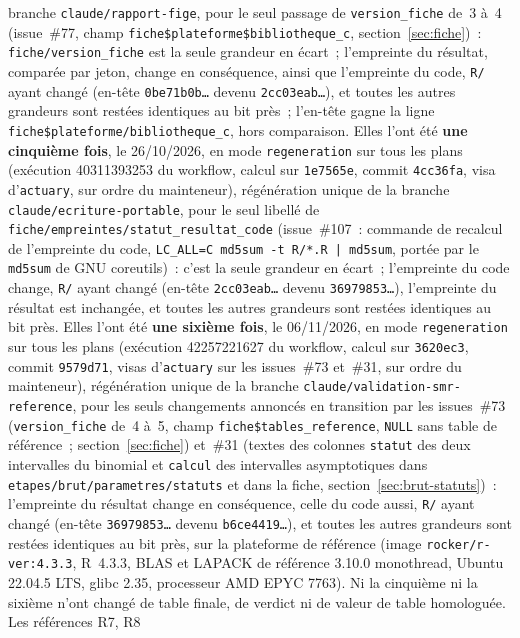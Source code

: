 \documentclass[a4paper,11pt]{article}
\newcommand{\code}[1]{\texttt{\small #1}}
\begin{document}
branche \code{claude/rapport-fige}, pour le seul passage de
\code{version\_fiche} de~3 à~4 (issue~\#77, champ
\code{fiche\$plateforme\$bibliotheque\_c}, section~\ref{sec:fiche})~:
\code{fiche/version\_fiche} est la seule grandeur en écart~; l'empreinte du
résultat, comparée par jeton, change en conséquence, ainsi que l'empreinte
du code, \code{R/} ayant changé (en-tête \code{0be71b0b\ldots} devenu
\code{2cc03eab\ldots}), et toutes les autres grandeurs sont restées
identiques au bit près~; l'en-tête gagne la ligne
\code{fiche\$plateforme/bibliotheque\_c}, hors comparaison. Elles l'ont été
\textbf{une cinquième fois}, le 26/10/2026, en mode \code{regeneration} sur
tous les plans (exécution 40311393253 du workflow, calcul sur
\code{1e7565e}, commit \code{4cc36fa}, visa d'\code{actuary}, sur ordre du
mainteneur), régénération unique de la branche
\code{claude/ecriture-portable}, pour le seul libellé de
\code{fiche/empreintes/statut\_resultat\_code} (issue~\#107~: commande de
recalcul de l'empreinte du code, \code{LC\_ALL=C md5sum -t R/*.R | md5sum},
portée par le \code{md5sum} de GNU coreutils)~: c'est la seule grandeur en
écart~; l'empreinte du code change, \code{R/} ayant changé (en-tête
\code{2cc03eab\ldots} devenu \code{36979853\ldots}), l'empreinte du
résultat est inchangée, et toutes les autres grandeurs sont restées
identiques au bit près. Elles l'ont été \textbf{une sixième fois}, le
06/11/2026, en mode \code{regeneration} sur tous les plans (exécution
42257221627 du workflow, calcul sur \code{3620ec3}, commit \code{9579d71},
visas d'\code{actuary} sur les issues~\#73 et~\#31, sur ordre du
mainteneur), régénération unique de la branche
\code{claude/validation-smr-reference}, pour les seuls changements annoncés
en transition par les issues~\#73 (\code{version\_fiche} de~4 à~5, champ
\code{fiche\$tables\_reference}, \code{NULL} sans table de référence~;
section~\ref{sec:fiche}) et~\#31 (textes des colonnes \code{statut} des
deux intervalles du binomial et \code{calcul} des intervalles
asymptotiques dans \code{etapes/brut/parametres/statuts} et dans la fiche,
section~\ref{sec:brut-statuts})~: l'empreinte du résultat change en
conséquence, celle du code aussi, \code{R/} ayant changé (en-tête
\code{36979853\ldots} devenu \code{b6ce4419\ldots}), et toutes les autres
grandeurs sont restées identiques au bit près, sur la plateforme de
référence (image \code{rocker/r-ver:4.3.3}, R~4.3.3, BLAS et LAPACK de
référence 3.10.0 monothread, Ubuntu 22.04.5 LTS, glibc 2.35, processeur
AMD EPYC 7763). Ni la cinquième ni la sixième n'ont changé de table
finale, de verdict ni de valeur de table homologuée. Les références R7, R8
\end{document}
